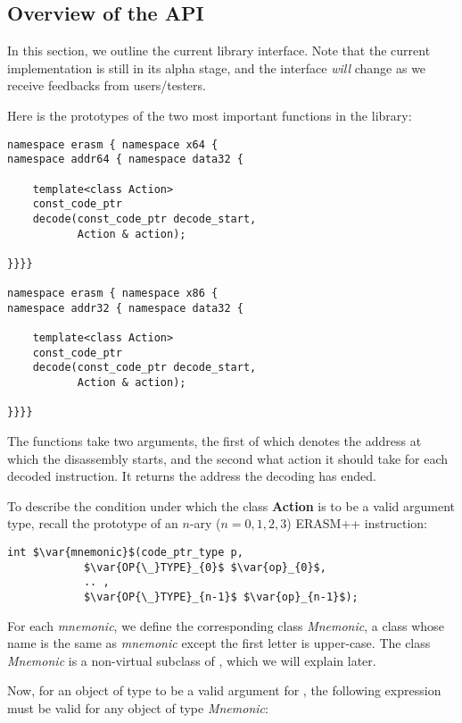 \documentclass{article}
\newcommand*{\var}[1]{\mathord{\mathit{#1}}}
\begin{document}
\subsection{Overview of the API}
\label{sec:overview-api}

In this section, we outline the current library interface. Note that
the current implementation is still in its alpha stage, and the interface
\emph{will} change as we receive feedbacks from users/testers. 

Here is the prototypes of the two most important functions in the library:
\begin{lstlisting}[frame=single]
namespace erasm { namespace x64 { 
namespace addr64 { namespace data32 {

    template<class Action>
    const_code_ptr
    decode(const_code_ptr decode_start,
           Action & action);

}}}}

namespace erasm { namespace x86 { 
namespace addr32 { namespace data32 {

    template<class Action>
    const_code_ptr
    decode(const_code_ptr decode_start,
           Action & action);

}}}}
\end{lstlisting}

The functions take two arguments, the first of which denotes the address at which
the disassembly starts, and the second what action it should take for each
decoded instruction. It returns the address the decoding has ended.

To describe the condition under which the class {\bf Action} is to be a
valid argument type, recall the prototype of an $n$-ary ($n = 0,1,2,3$)
ERASM++ instruction:
\begin{lstlisting}[mathescape,frame=single]
int $\var{mnemonic}$(code_ptr_type p,
            $\var{OP{\_}TYPE}_{0}$ $\var{op}_{0}$, 
            .. ,
            $\var{OP{\_}TYPE}_{n-1}$ $\var{op}_{n-1}$);
\end{lstlisting}

For each \textit{mnemonic}, we define the corresponding class
\textit{Mnemonic}, a class whose name is the same as \textit{mnemonic}
except the first letter is upper-case. The class \textit{Mnemonic} is
a non-virtual subclass of , which we will explain
later.

Now, for an object  of type  to be a valid argument
for , the following expression must be valid for
any object  of type \textit{Mnemonic}:
\end{document}
